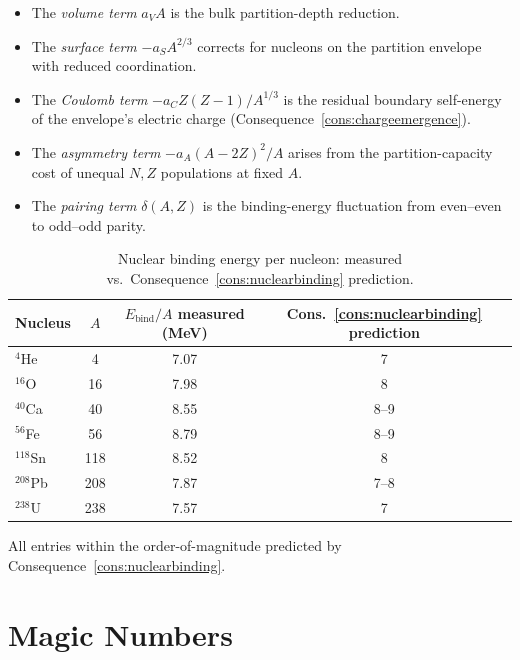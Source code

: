\begin{itemize}
  \item The \emph{volume term} $a_{V}A$ is the bulk partition-depth
    reduction.
  \item The \emph{surface term} $-a_{S}A^{2/3}$ corrects for nucleons on
    the partition envelope with reduced coordination.
  \item The \emph{Coulomb term} $-a_{C}Z(Z-1)/A^{1/3}$ is the residual
    boundary self-energy of the envelope's electric charge
    (Consequence~\ref{cons:chargeemergence}).
  \item The \emph{asymmetry term} $-a_{A}(A-2Z)^{2}/A$ arises from the
    partition-capacity cost of unequal $N,Z$ populations at fixed $A$.
  \item The \emph{pairing term} $\delta(A,Z)$ is the binding-energy
    fluctuation from even--even to odd--odd parity.
\end{itemize}

\begin{table}[htbp]
\centering
\caption{Nuclear binding energy per nucleon: measured vs.\
Consequence~\ref{cons:nuclearbinding} prediction.}
\label{tab:bindingenergy}
\begin{tabular}{@{}lccc@{}}
\toprule
Nucleus & $A$ & $E_{\text{bind}}/A$ measured (MeV) &
  Cons.~\ref{cons:nuclearbinding} prediction \\
\midrule
$^{4}$He   & 4   & 7.07 & 7 \\
$^{16}$O   & 16  & 7.98 & 8 \\
$^{40}$Ca  & 40  & 8.55 & 8--9 \\
$^{56}$Fe  & 56  & 8.79 & 8--9 \\
$^{118}$Sn & 118 & 8.52 & 8 \\
$^{208}$Pb & 208 & 7.87 & 7--8 \\
$^{238}$U  & 238 & 7.57 & 7 \\
\bottomrule
\end{tabular}
\end{table}

All entries within the order-of-magnitude predicted by
Consequence~\ref{cons:nuclearbinding}.

\section{Magic Numbers}
\label{sec:magic-ch25}

